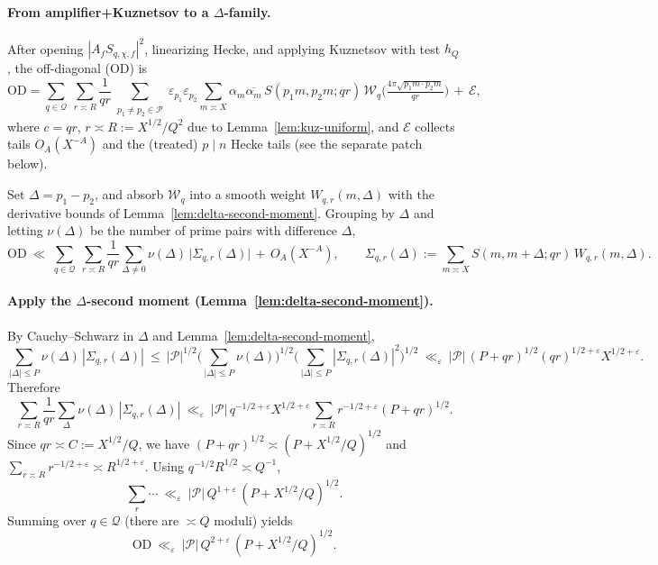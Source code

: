 \documentclass[11pt]{article}
\theoremstyle{definition}
\theoremstyle{remark}
\begin{document}
\paragraph{From amplifier+Kuznetsov to a $\Delta$-family.}
After opening $|A_f S_{q,\chi,f}|^2$, linearizing Hecke, and applying Kuznetsov with test $h_Q$, the off-diagonal (OD) is
\[
	\mathrm{OD}
	=\sum_{q\in\mathcal Q}\ \sum_{r\asymp R}\frac{1}{qr}
	\!\!\sum_{\substack{p_1\ne p_2\in\mathcal P}}\!\!\varepsilon_{p_1}\varepsilon_{p_2}\!
	\sum_{m\asymp X}\alpha_m\overline{\alpha_{m}}\,
	S(p_1m,p_2m;qr)\,\mathcal W_{q}\!\Big(\tfrac{4\pi\sqrt{p_1m\cdot p_2m}}{qr}\Big)\,+\,\mathcal E,
\]
where $c=qr$, $r\asymp R:=X^{1/2}/Q^{2}$ due to Lemma~\ref{lem:kuz-uniform}, and $\mathcal E$ collects tails $O_A(X^{-A})$ and the (treated) $p\mid n$ Hecke tails (see the separate patch below).

Set $\Delta=p_1-p_2$, and absorb $\mathcal W_q$ into a smooth weight $W_{q,r}(m,\Delta)$ with the derivative bounds of Lemma~\ref{lem:delta-second-moment}. Grouping by $\Delta$ and letting $\nu(\Delta)$ be the number of prime pairs with difference $\Delta$,
\[
	\mathrm{OD}\ \ll\ \sum_{q\in\mathcal Q}\ \sum_{r\asymp R}\frac{1}{qr}\sum_{\Delta\ne 0}\nu(\Delta)\,
	\Big|\Sigma_{q,r}(\Delta)\Big| \,+\, O_A(X^{-A}),\qquad
	\Sigma_{q,r}(\Delta):=\sum_{m\asymp X} S(m,m+\Delta;qr)\,W_{q,r}(m,\Delta).
\]

\paragraph{Apply the $\Delta$-second moment (Lemma~\ref{lem:delta-second-moment}).}
By Cauchy–Schwarz in $\Delta$ and Lemma~\ref{lem:delta-second-moment},
\[
	\sum_{|\Delta|\le P}\nu(\Delta)\,|\Sigma_{q,r}(\Delta)|
	\ \le\ |\mathcal P|^{1/2}\Big(\sum_{|\Delta|\le P}\nu(\Delta)\Big)^{1/2}
	\Big(\sum_{|\Delta|\le P}|\Sigma_{q,r}(\Delta)|^2\Big)^{1/2}
	\ \ll_\varepsilon\ |\mathcal P|\,(P+qr)^{1/2}(qr)^{1/2+\varepsilon}X^{1/2+\varepsilon}.
\]
Therefore
\[
	\sum_{r\asymp R}\frac{1}{qr}\sum_{\Delta}\nu(\Delta)\,|\Sigma_{q,r}(\Delta)|
	\ \ll_\varepsilon\ |\mathcal P|\,q^{-1/2+\varepsilon}X^{1/2+\varepsilon}\!\!\sum_{r\asymp R} r^{-1/2+\varepsilon}(P+qr)^{1/2}.
\]
Since $qr\asymp C:=X^{1/2}/Q$, we have $(P+qr)^{1/2}\asymp (P+X^{1/2}/Q)^{1/2}$ and $\sum_{r\asymp R} r^{-1/2+\varepsilon}\asymp R^{1/2+\varepsilon}$. Using $q^{-1/2}R^{1/2}\asymp Q^{-1}$,
\[
	\sum_{r}\cdots\ \ll_\varepsilon\ |\mathcal P|\,Q^{1+\varepsilon}\,(P+X^{1/2}/Q)^{1/2}.
\]
Summing over $q\in\mathcal Q$ (there are $\asymp Q$ moduli) yields
\begin{equation}\label{eq:OD-final}
	\mathrm{OD}\ \ll_\varepsilon\ |\mathcal P|\,Q^{2+\varepsilon}\,(P+X^{1/2}/Q)^{1/2}.
\end{equation}
\end{document}
